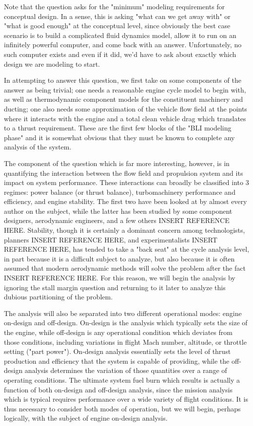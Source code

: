 Note that the question asks for the "minimum" modeling requirements for conceptual design.  In a sense, this is asking "what can we get away with" or "what is good enough" at the conceptual level, since obviously the best case scenario is to build a complicated fluid dynamics model, allow it to run on an infinitely powerful computer, and come back with an answer.  Unfortunately, no such computer exists and even if it did, we'd have to ask about exactly which design we are modeling to start.

In attempting to answer this question, we first take on some components of the answer as being trivial; one needs a reasonable engine cycle model to begin with, as well as thermodynamic component models for the constituent machinery and ducting;  one also needs some approximation of the vehicle flow field at the points where it interacts with the engine and a total clean vehicle drag which translates to a thrust requirement.  These are the first few blocks of the "BLI modeling phase" and it is somewhat obvious that they must be known to complete any analysis of the system.  

The component of the question which is far more interesting, however, is in quantifying the interaction between the flow field and propulsion system and its impact on system performance.  These interactions can broadly be classified into 3 regimes: power balance (or thrust balance), turbomachinery performance and efficiency, and engine stability.  The first two have been looked at by almost every author on the subject, while the latter has been studied by some component designers, aerodynamic engineers, and a few others INSERT REFERENCE HERE.  Stability, though it is certainly a dominant concern among technologists, planners INSERT REFERENCE HERE, and experimentalists INSERT REFERENCE HERE, has tended to take a "back seat" at the cycle analysis level, in part because it is a difficult subject to analyze, but also because it is often assumed that modern aerodynamic methods will solve the problem after the fact INSERT REFERENCE HERE.  For this reason, we will begin the analysis by ignoring the stall margin question and returning to it later to analyze this dubious partitioning of the problem.

The analysis will also be separated into two different operational modes: engine on-design and off-design.  On-design is the analysis which typically sets the size of the engine, while off-design is any operational condition which deviates from those conditions, including variations in flight Mach number, altitude, or throttle setting ("part power").  On-design analysis essentially sets the level of thrust production and efficiency that the system is capable of providing, while the off-design analysis determines the variation of those quantities over a range of operating conditions.  The ultimate system fuel burn which results is actually a function of both on-design and off-design analysis, since the mission analysis which is typical requires performance over a wide variety of flight conditions.  It is thus necessary to consider both modes of operation, but we will begin, perhaps logically, with the subject of engine on-design analysis.

